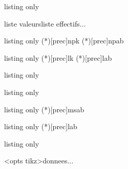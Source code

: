 \begin{PresCodeTexPL}{listing only}
\pflcourbeecc

\begin{EnvCourbeECC}[clés]{liste valeurs}{liste effectifs}...\end{EnvCourbeECC}
\end{PresCodeTexPL}

\begin{PresCodeTexPL}{listing only}
\BinomP(*)[prec]{n}{p}{k}
\BinomC(*)[prec]{n}{p}{a}{b}
\pflbinomp
\pflbinomc
\end{PresCodeTexPL}

\begin{PresCodeTexPL}{listing only}
\PoissonP(*)[prec]{l}{k}
\PoissonC(*)[prec]{l}{a}{b}
\pflpoissonp
\pflpoissonc
\end{PresCodeTexPL}

\begin{PresCodeTexPL}{listing only}
\pflgeomp
\pflgeomc
\end{PresCodeTexPL}

\begin{PresCodeTexPL}{listing only}
\pflhypergeomp
\pflhypergeomc
\end{PresCodeTexPL}

\begin{PresCodeTexPL}{listing only}
\NormaleC(*)[prec]{m}{s}{a}{b}
\pflnormalec
\end{PresCodeTexPL}

\begin{PresCodeTexPL}{listing only}
\ExpoC(*)[prec]{l}{a}{b}
\pflexpoc
\end{PresCodeTexPL}

\begin{PresCodeTexPL}{listing only}
\pflarbreprobas

\begin{EnvArbreProbasTikz}[options]<opts tikz>{donnees}...\end{EnvArbreProbasTikz}
\end{PresCodeTexPL}

